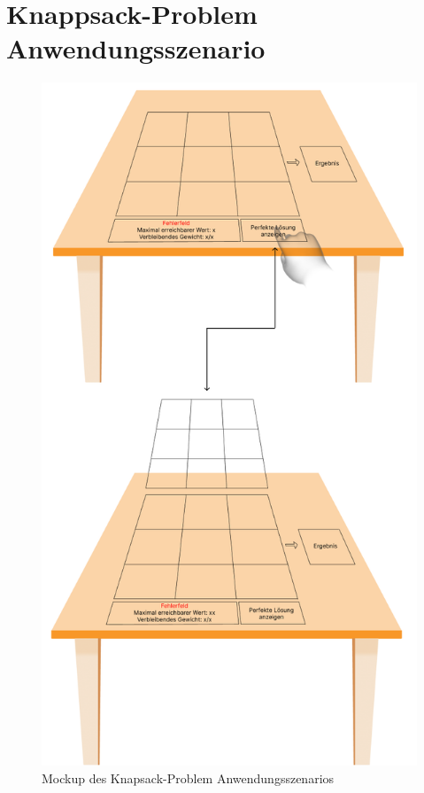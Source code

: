 \section{Knappsack-Problem Anwendungsszenario}
\begin{figure}[htbp]
    \centering
    \includegraphics[scale=0.75]{images/MockUpKnapsack}
    \caption{Mockup des Knapsack-Problem Anwendungsszenarios}
\end{figure}
\newpage
